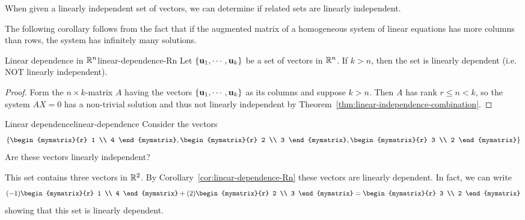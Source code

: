 When given a linearly independent set of vectors, we can determine if related sets are linearly independent. 

The following corollary follows from the fact that if the augmented matrix of a homogeneous
system of linear equations has more columns than rows, the system has infinitely many
solutions.

\begin{corollary}{Linear dependence in $\mathbb{R}^{n}$}{linear-dependence-Rn}
Let $\left\{\mbox{\bf u}_{1},\cdots ,\mbox{\bf u}_{k}\right\} $
be a set of vectors in $\mathbb{R}^{n}$. 
If $k>n$, then the set is linearly dependent (i.e. NOT linearly independent).
\end{corollary}

\begin{proof}
Form the $n \times k$-matrix $A$ having the vectors $\left\{
\mbox{\bf u}_{1},\cdots ,\mbox{\bf u}_{k}\right\} $ as its columns and suppose $k > n$. Then $A$ has rank $r \leq n <k$, so 
the system $AX=0$ has a non-trivial solution %
 and thus not linearly independent by Theorem~\ref{thm:linear-independence-combination}.
\end{proof}

\begin{example}{Linear dependence}{linear-dependence}
Consider the vectors 
\[
\set{\begin{mymatrix}{r}
1 \\
4 
\end{mymatrix}, 
\begin{mymatrix}{r}
2 \\
3
\end{mymatrix}, 
\begin{mymatrix}{r}
3 \\
2
\end{mymatrix} }
\]
Are these vectors linearly independent?
\end{example}

\begin{solution}
This set contains three vectors in $\mathbb{R}^2$. By Corollary~\ref{cor:linear-dependence-Rn} these vectors are linearly dependent.
In fact, we can write
\[
(-1) \begin{mymatrix}{r}
1 \\
4 
\end{mymatrix} + (2) 
\begin{mymatrix}{r}
2 \\
3
\end{mymatrix} = 
\begin{mymatrix}{r}
3 \\
2
\end{mymatrix}
\]
showing that this set is linearly dependent. 
\end{solution}

